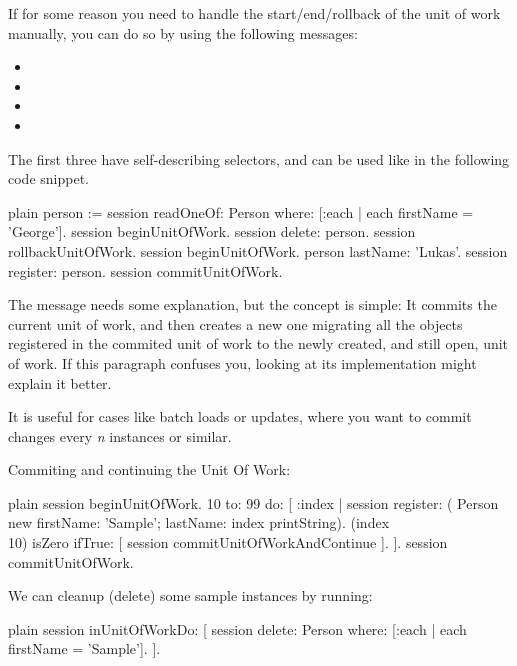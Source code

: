 \documentclass[10pt,twoside,english]{_support/latex/sbabook/sbabook}
\begin{document}
If for some reason you need to handle the start/end/rollback of the
unit of work manually, you can do so by using the following messages:

\begin{itemize}
\item {}
\item {}
\item {}
\item {}
\end{itemize}

The first three have self-describing selectors, and can be used like in the following code snippet.

\begin{displaycode}{plain}
person := session
	readOneOf: Person
	where: [:each | each firstName = 'George'].
session beginUnitOfWork.
session delete: person.
session rollbackUnitOfWork.
session beginUnitOfWork.
person lastName: 'Lukas'.
session register: person.
session commitUnitOfWork.
\end{displaycode}

The message  needs some explanation,
but the concept is simple: It commits the current unit of work, and then
creates a new one migrating all the objects registered in the commited unit of
work to the newly created, and still open, unit of work. If this paragraph
confuses you, looking at its implementation might explain it better.

It is useful for cases like batch loads or updates,
where you want to commit changes every \textit{n} instances or similar.

Commiting and continuing the Unit Of Work: 

\begin{displaycode}{plain}
session beginUnitOfWork.
10 to: 99 do: [ :index |
	session register: (
	Person new
		firstName: 'Sample';
		lastName: index printString).
	(index \\ 10) isZero ifTrue: [
		session commitUnitOfWorkAndContinue
	].
].
session commitUnitOfWork.
\end{displaycode}

We can cleanup (delete) some sample instances by running:

\begin{displaycode}{plain}
session inUnitOfWorkDo: [
		session
			delete: Person
			where: [:each | each firstName = 'Sample'].
].
\end{displaycode}
\end{document}
